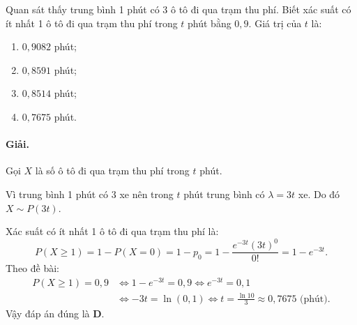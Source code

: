 \begin{vidu}[VD 2]
Quan sát thấy trung bình 1 phút có 3 ô tô đi qua trạm thu phí. Biết xác suất có ít nhất 1 ô tô đi qua trạm thu phí trong $t$ phút bằng $0{,}9$. Giá trị của $t$ là:
\begin{enumerate}[label=\Alph*.]
    \item $0{,}9082$ phút;
    \item $0{,}8591$ phút;
    \item $0{,}8514$ phút;
    \item $0{,}7675$ phút.
\end{enumerate}

\paragraph{Giải.}
Gọi $X$ là số ô tô đi qua trạm thu phí trong $t$ phút.

Vì trung bình 1 phút có 3 xe nên trong $t$ phút trung bình có $\lambda = 3t$ xe. Do đó $X \sim P(3t)$.

Xác suất có ít nhất 1 ô tô đi qua trạm thu phí là:
\[
P(X \ge 1) = 1 - P(X = 0) = 1 - p_0 = 1 - \frac{e^{-3t} (3t)^0}{0!} = 1 - e^{-3t}.
\]
Theo đề bài:
\begin{align*}
P(X \ge 1) = 0{,}9 &\iff 1 - e^{-3t} = 0{,}9 \iff e^{-3t} = 0{,}1 \\
&\iff -3t = \ln(0{,}1) \iff t = \frac{\ln 10}{3} \approx 0{,}7675 \text{ (phút)}.
\end{align*}
Vậy đáp án đúng là \textbf{D}.
\end{vidu}

